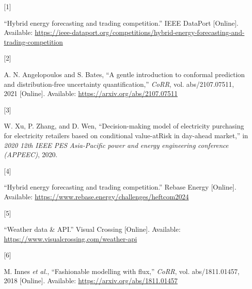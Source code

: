 \documentclass[
  journal,
]{IEEEtran}%
\newlength{\cslhangindent}
\newlength{\csllabelwidth}
\newenvironment{CSLReferences}[2] %
 {\begin{list}{}{%
  \setlength{\itemindent}{0pt}
  \setlength{\leftmargin}{0pt}
  \setlength{\parsep}{0pt}
  \ifodd #1
   \setlength{\leftmargin}{\cslhangindent}
   \setlength{\itemindent}{-1\cslhangindent}
  \fi
  \setlength{\itemsep}{#2\baselineskip}}}
 {\end{list}}
\newcommand{\CSLLeftMargin}[1]{\parbox[t]{\csllabelwidth}{\strut#1\strut}}
\newcommand{\CSLRightInline}[1]{\parbox[t]{\linewidth - \csllabelwidth}{\strut#1\strut}}
\providecommand{\bibfont}{\footnotesize}
\begin{document}
\label{refs}
\begin{CSLReferences}{0}{0}
\CSLLeftMargin{{[}1{]} }%
\CSLRightInline{{``Hybrid energy forecasting and trading competition.''}
IEEE DataPort {[}Online{]}. Available:
\url{https://ieee-dataport.org/competitions/hybrid-energy-forecasting-and-trading-competition}}

\CSLLeftMargin{{[}2{]} }%
\CSLRightInline{A. N. Angelopoulos and S. Bates, {``A gentle
introduction to conformal prediction and distribution-free uncertainty
quantification,''} \emph{CoRR}, vol. abs/2107.07511, 2021 {[}Online{]}.
Available: \url{https://arxiv.org/abs/2107.07511}}

\CSLLeftMargin{{[}3{]} }%
\CSLRightInline{W. Xu, P. Zhang, and D. Wen, {``Decision-making model of
electricity purchasing for electricity retailers based on conditional
value-atRisk in day-ahead market,''} in \emph{2020 12th {IEEE} {PES}
{Asia-Pacific} power and energy engineering conference ({APPEEC})},
2020. }

\CSLLeftMargin{{[}4{]} }%
\CSLRightInline{{``Hybrid energy forecasting and trading competition.''}
Rebase Energy {[}Online{]}. Available:
\url{https://www.rebase.energy/challenges/heftcom2024}}

\CSLLeftMargin{{[}5{]} }%
\CSLRightInline{{``Weather data \& API.''} Visual Crossing {[}Online{]}.
Available: \url{https://www.visualcrossing.com/weather-api}}

\CSLLeftMargin{{[}6{]} }%
\CSLRightInline{M. Innes \emph{et al.}, {``Fashionable modelling with
flux,''} \emph{CoRR}, vol. abs/1811.01457, 2018 {[}Online{]}. Available:
\url{https://arxiv.org/abs/1811.01457}}

\end{CSLReferences}


\ifCLASSOPTIONcaptionsoff
  \newpage
\fi



\pagebreak[3]
\end{document}
